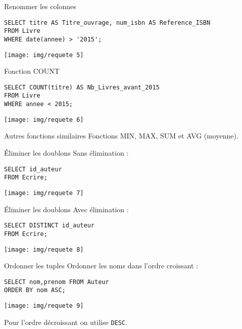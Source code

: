 \documentclass[10pt]{nsibeamer}
\begin{document}
\begin{frame}[fragile]{Renommer les colonnes}
	\begin{verbatim}
SELECT titre AS Titre_ouvrage, num_isbn AS Reference_ISBN
FROM Livre
WHERE date(annee) > '2015';
    \end{verbatim}
    \pause
    \begin{center}
    \texttt{[image: img/requete 5]}
    \end{center}
\end{frame}

\begin{frame}[fragile]{Fonction COUNT}
	\begin{verbatim}
SELECT COUNT(titre) AS Nb_Livres_avant_2015
FROM Livre
WHERE annee < 2015;    \end{verbatim}
\pause
    \begin{center}
    \texttt{[image: img/requete 6]}
    \end{center}
\end{frame}
\begin{frame}{Autres fonctions similaires}
	Fonctions MIN, MAX, SUM et AVG (moyenne).
\end{frame}
\begin{frame}[fragile]{\'Eliminer les doublons}
Sans élimination :
	\begin{verbatim}
SELECT id_auteur
FROM Ecrire;
    \end{verbatim}
    \pause
    \begin{center}
    \texttt{[image: img/requete 7]}
    \end{center}
\end{frame}

\begin{frame}[fragile]{\'Eliminer les doublons}
Avec élimination :
	\begin{verbatim}
SELECT DISTINCT id_auteur
FROM Ecrire;
    \end{verbatim}
    \pause
    \begin{center}
    \texttt{[image: img/requete 8]}
    \end{center}
\end{frame}

\begin{frame}[fragile]{Ordonner les tuples}
Ordonner les noms dans l'ordre croissant :
	\begin{verbatim}
SELECT nom,prenom FROM Auteur
ORDER BY nom ASC;
    \end{verbatim}
    \pause
    \begin{center}
    \texttt{[image: img/requete 9]}
    \end{center}\pause
    Pour l'ordre décroissant on utilise \texttt{DESC}.
\end{frame}
\end{document}
